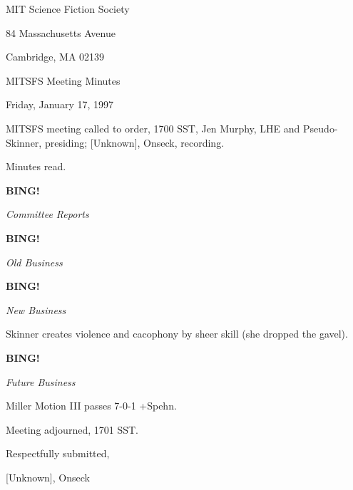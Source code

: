 \documentclass[12pt]{article}
\newcommand{\bing}{{\bf BING!} }
\newcommand{\goto}[1]{\bing \vskip 12pt \centerline{{\em{#1}}}}
\begin{document}
\begin{center}

MIT Science Fiction Society 

84 Massachusetts Avenue

Cambridge, MA 02139

\vspace{12pt}

MITSFS Meeting Minutes 

Friday, January 17, 1997

\end{center}
 
\vspace{18pt}

\setlength{\parskip}{6pt}

\noindent
MITSFS meeting called to order, 1700 SST,
Jen Murphy, LHE and Pseudo-Skinner, presiding; [Unknown], Onseck, recording.

Minutes read.

\goto{Committee Reports}

\goto{Old Business}

\goto{New Business}

Skinner creates violence and cacophony by sheer skill (she dropped the gavel).

\goto{Future Business}

Miller Motion III passes 7-0-1 +Spehn.

\vspace{12pt}

\noindent
Meeting adjourned, 1701 SST.

\vspace{18pt}

\centerline{Respectfully submitted,}
\centerline{[Unknown], Onseck}
\end{document}
